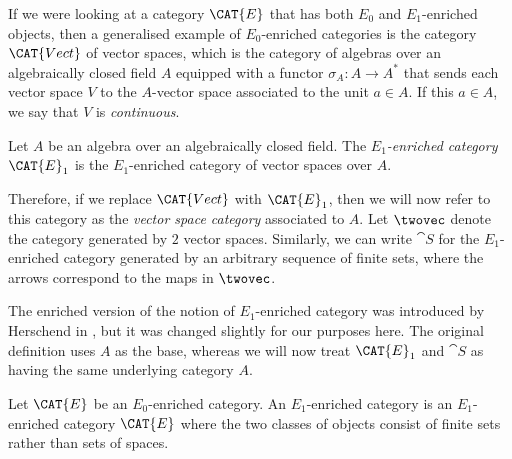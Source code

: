 \documentclass[a4paper,reqno,oneside]{article}
\begin{document}
If we were looking at a category $\CAT{E}$ that has both $E_0$ and $E_1$-enriched 
objects, then a generalised example of $E_0$-enriched categories is the category $\CAT{Vect}$
of vector spaces, which is the category of algebras over an algebraically closed field $A$ equipped with a functor
$\sigma_A: A \rightarrow A^*$ that sends each vector space $V$ to the $A$-vector space associated to the unit $a \in A$. If this $a \in A$, we say that $V$ is \emph{continuous}. 

\begin{definition}
Let $A$ be an algebra over an algebraically closed field. The \emph{$E_1$-enriched category} $\CAT{E}_1$ is the $E_1$-enriched category of vector spaces over $A$. 
\end{definition}

Therefore, if we replace $\CAT{Vect}$ with $\CAT{E}_1$, then we will now refer to
this category as the \emph{vector space category} associated to $A$. Let $\twovec$ denote the category 
generated by $2$ vector spaces. Similarly, we can write $\cat{S}$ for the $E_1$-enriched category generated by an arbitrary sequence of finite sets, where the arrows correspond to the maps in $\twovec$. 

The enriched version of the notion of $E_1$-enriched category was introduced by
Herschend in \cite{herschend2020higher}, but it was changed slightly for 
our purposes here. The original definition uses $A$ as the base, whereas we will 
now treat $\CAT{E}_1$ and $\cat{S}$ as having the same underlying category $A$.

\begin{definition}
Let $\CAT{E}$ be an $E_0$-enriched category. An $E_1$-enriched category is an $E_1$-enriched category $\CAT{E}$ where the two classes of objects consist of finite sets rather than sets of spaces.
\end{definition}
\end{document}
